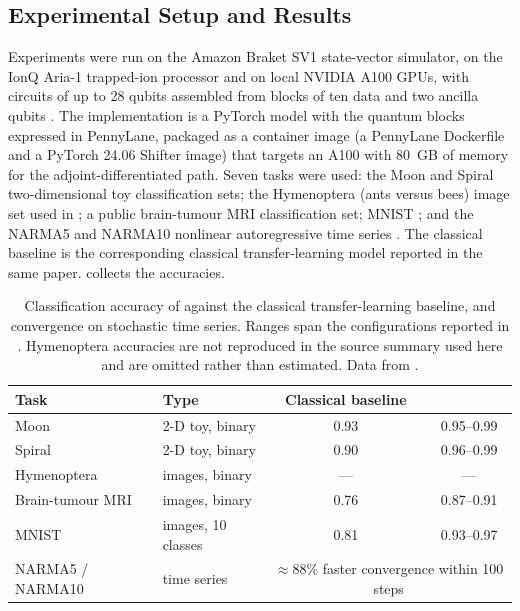 \subsection{Experimental Setup and Results}\label{sec:qml:qpie:results}

Experiments were run on the Amazon Braket SV1 state-vector simulator, on the IonQ Aria-1 trapped-ion processor and on local NVIDIA A100 GPUs, with circuits of up to 28 qubits assembled from blocks of ten data and two ancilla qubits \cite{guo2025qpie}. The implementation is a PyTorch model with the quantum blocks expressed in PennyLane, packaged as a container image (a PennyLane Dockerfile and a PyTorch 24.06 Shifter image) that targets an A100 with \SI{80}{GB} of memory for the adjoint-differentiated path. Seven tasks were used: the Moon and Spiral two-dimensional toy classification sets; the Hymenoptera (ants versus bees) image set used in \cite{mari2020transferlearning}; a public brain-tumour MRI classification set; MNIST \cite{lecun1998mnist}; and the NARMA5 and NARMA10 nonlinear autoregressive time series \cite{atiya2000narma}. The classical baseline is the corresponding classical transfer-learning model reported in the same paper.  collects the accuracies.

\begin{table}[htbp]
\caption{Classification accuracy of \qpie{} against the classical transfer-learning baseline, and convergence on stochastic time series. Ranges span the configurations reported in \cite{guo2025qpie}. Hymenoptera accuracies are not reproduced in the source summary used here and are omitted rather than estimated. Data from \cite{guo2025qpie}.}\label{tab:qml:qpie-results}
\centering
\small
\begin{tabular}{@{}llcc@{}}
\toprule
Task & Type & Classical baseline & \qpie{} \\
\midrule
Moon & 2-D toy, binary & 0.93 & 0.95--0.99 \\
Spiral & 2-D toy, binary & 0.90 & 0.96--0.99 \\
Hymenoptera & images, binary & --- & --- \\
Brain-tumour MRI & images, binary & 0.76 & 0.87--0.91 \\
MNIST & images, 10 classes & 0.81 & 0.93--0.97 \\
\midrule
NARMA5 / NARMA10 & time series & \multicolumn{2}{c}{$\approx$88\% faster convergence within 100 steps} \\
\bottomrule
\end{tabular}
\end{table}

